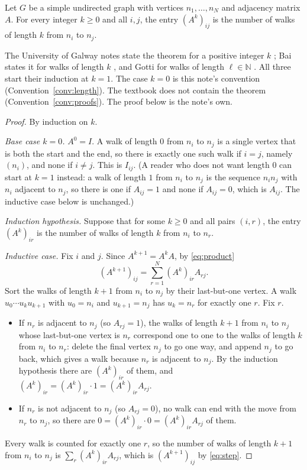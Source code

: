 \begin{theorem}\label{thm:counting}
Let $G$ be a simple undirected graph with vertices $n_1,\dots,n_N$ and
adjacency matrix $A$. For every integer $k\ge 0$ and all $i,j$, the entry
$(A^k)_{ij}$ is the number of walks of length $k$ from $n_i$ to $n_j$.
\end{theorem}
The University of Galway notes state the theorem for a positive integer $k$
\cite[Theorem~1.1.3, p.~4]{galwaynotes}; Bai states it for walks of length
$k$ \cite[Theorem~1, p.~1]{bai2025adjacency}, and Gotti for walks of length
$\ell\in\mathbb{N}$ \cite[Proposition~2, p.~1]{gotti18211}. All three start
their induction at $k=1$. The case $k=0$ is this note's convention
(Convention~\ref{conv:length}). The textbook does not contain the theorem
(Convention~\ref{conv:proofs}). The proof below is the note's own.
\begin{proof}
By induction on $k$.

\emph{Base case $k=0$.} $A^0=I$. A walk of length $0$ from $n_i$ to $n_j$ is
a single vertex that is both the start and the end, so there is exactly one
such walk if $i=j$, namely $(n_i)$, and none if $i\ne j$. This is $I_{ij}$.
(A reader who does not want length $0$ can start at $k=1$ instead: a walk
of length $1$ from $n_i$ to $n_j$ is the sequence $n_in_j$ with $n_i$
adjacent to $n_j$, so there is one if $A_{ij}=1$ and none if $A_{ij}=0$,
which is $A_{ij}$. The inductive case below is unchanged.)

\emph{Induction hypothesis.} Suppose that for some $k\ge 0$ and all pairs
$(i,r)$, the entry $(A^k)_{ir}$ is the number of walks of length $k$ from
$n_i$ to $n_r$.

\emph{Inductive case.} Fix $i$ and $j$. Since $A^{k+1}=A^kA$,
by \cref{eq:product}
\begin{equation}\label{eq:step}
(A^{k+1})_{ij}=\sum_{r=1}^{N}(A^k)_{ir}A_{rj}.
\end{equation}
Sort the walks of length $k+1$ from $n_i$ to $n_j$ by their last-but-one
vertex. A walk $u_0\cdots u_ku_{k+1}$ with $u_0=n_i$ and $u_{k+1}=n_j$ has
$u_k=n_r$ for exactly one $r$. Fix $r$.
\begin{itemize}
\item If $n_r$ is adjacent to $n_j$ (so $A_{rj}=1$), the walks of length
  $k+1$ from $n_i$ to $n_j$ whose last-but-one vertex is $n_r$ correspond
  one to one to the walks of length $k$ from $n_i$ to $n_r$: delete the
  final vertex $n_j$ to go one way, and append $n_j$ to go back, which
  gives a walk because $n_r$ is adjacent to $n_j$. By the induction
  hypothesis there are $(A^k)_{ir}$ of them, and $(A^k)_{ir}=(A^k)_{ir}\cdot 1=(A^k)_{ir}A_{rj}$.
\item If $n_r$ is not adjacent to $n_j$ (so $A_{rj}=0$), no walk can end
  with the move from $n_r$ to $n_j$, so there are $0=(A^k)_{ir}\cdot 0=(A^k)_{ir}A_{rj}$ of
  them.
\end{itemize}
Every walk is counted for exactly one $r$, so the number of walks of length
$k+1$ from $n_i$ to $n_j$ is $\sum_r(A^k)_{ir}A_{rj}$, which is
$(A^{k+1})_{ij}$ by \cref{eq:step}.
\end{proof}

